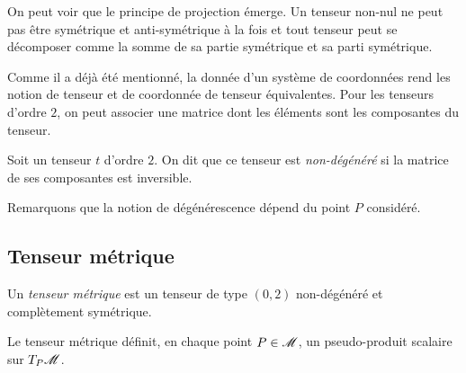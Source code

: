 \documentclass[a4paper,11pt]{report}
\begin{document}
                \begin{rmk}
                    On peut voir que le principe de projection émerge. Un tenseur non-nul ne peut pas être symétrique et anti-symétrique à la fois et tout tenseur peut se décomposer comme la somme de sa partie symétrique et sa parti symétrique.
                \end{rmk}
                
                Comme il a déjà été mentionné, la donnée d'un système de coordonnées rend les notion de tenseur et de coordonnée de tenseur équivalentes. Pour les tenseurs d'ordre $2$, on peut associer une matrice dont les éléments sont les composantes du tenseur.\\
                
                \begin{definition}
                    Soit un tenseur $t$ d'ordre $2$. On dit que ce tenseur est \textit{non-dégénéré} si la matrice de ses composantes est inversible.
                \end{definition}
                
                Remarquons que la notion de dégénérescence dépend du point $P$ considéré.
                
            \subsection{Tenseur métrique}
                
                \begin{definition}
                    Un \textit{tenseur métrique} est un tenseur de type $(0,2)$ non-dégénéré et complètement symétrique.
                \end{definition}
                
                \begin{prop}\begin{leftbar}
                    Le tenseur métrique définit, en chaque point $P\in\mathscr{M}$, un pseudo-produit scalaire sur $T_P\mathscr{M}$.
                \end{leftbar}\end{prop}
                
\end{document}
